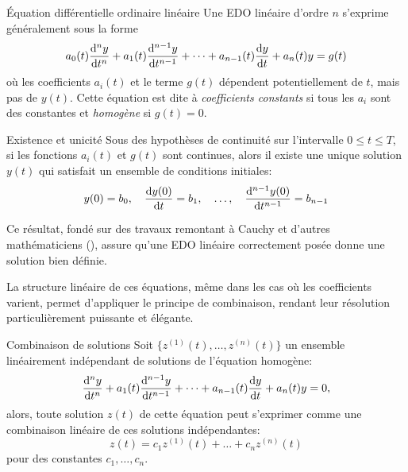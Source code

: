             \begin{definition}{Équation différentielle ordinaire linéaire}  
                Une EDO linéaire d'ordre $n$ s'exprime généralement sous la forme
                \begin{equation}
                a_0(t)\frac {\mathrm d^{n}{y}}{\mathrm d{t}^{n}} + a_1(t) \frac {\mathrm d^{n-1}{y}}{\mathrm d{t}^{n-1}} + \dots + a_{n-1}(t) \frac {\mathrm d{y}}{\mathrm d{t}} + a_n(t)y=g(t)
                \end{equation}
                où les coefficients $a_i(t)$ et le terme $g(t)$ dépendent potentiellement de $t$, mais pas de $y(t)$. Cette équation est dite à \emph{coefficients constants} si tous les $a_i$ sont des constantes et \emph{homogène} si $g(t)=0$.  
            \end{definition}
            
            \begin{theorem}{Existence et unicité}  
                Sous des hypothèses de continuité sur l'intervalle $0 \leq t \leq T$, si les fonctions $a_i(t)$ et $g(t)$ sont continues, alors il existe une unique solution $y(t)$ qui satisfait un ensemble de conditions initiales:
                \begin{equation}
                y(0)=b_0, \quad \frac {\mathrm d{y(0)}}{\mathrm d{t}}=b_1, \quad \dots, \quad \frac {\mathrm d^{n-1}{y(0)}}{\mathrm d{t}^{n-1}}=b_{n-1}
                \end{equation}
            \end{theorem}
            Ce résultat, fondé sur des travaux remontant à Cauchy et d'autres mathématiciens (\cite{Cauchy1840}), assure qu'une EDO linéaire correctement posée donne une solution bien définie.

            La structure linéaire de ces équations, même dans les cas où les coefficients varient, permet d'appliquer le principe de combinaison, rendant leur résolution particulièrement puissante et élégante.
            
            \begin{theorem}{Combinaison de solutions}  
                Soit $\{z^{(1)}(t), \dots, z^{(n)}(t)\}$ un ensemble linéairement indépendant de solutions de l'équation homogène: 
                \begin{equation}
                \frac {\mathrm d^{n}{y}}{\mathrm d{t}^{n}} + a_1(t) \frac {\mathrm d^{n-1}{y}}{\mathrm d{t}^{n-1}} + \dots + a_{n-1}(t) \frac {\mathrm d{y}}{\mathrm d{t}} + a_n(t)y = 0,
                \end{equation}
                alors, toute solution $z(t)$ de cette équation peut s'exprimer comme une combinaison linéaire de ces solutions indépendantes:
                \begin{equation}
                z(t)=c_1 z^{(1)}(t) + \dots + c_n z^{(n)}(t)
                \end{equation}
                pour des constantes $c_1, \dots, c_n$.
            \end{theorem}
        
